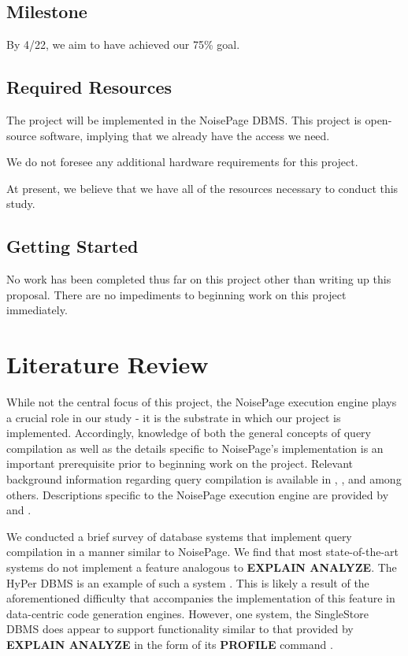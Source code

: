 \documentclass{vldb}
\newcommand{\dbCode}[1]{{\sffamily\small \textbf{#1}}\xspace}
\begin{document}
\subsection{Milestone}

By 4/22, we aim to have achieved our 75\% goal.

\subsection{Required Resources}

The project will be implemented in the NoisePage DBMS. This project is open-source software, implying that we already have the access we need. 

We do not foresee any additional hardware requirements for this project.

At present, we believe that we have all of the resources necessary to conduct this study.

\subsection{Getting Started}

No work has been completed thus far on this project other than writing up this proposal. There are no impediments to beginning work on this project immediately.


\section{Literature Review}

While not the central focus of this project, the NoisePage execution engine plays a crucial role in our study - it is the substrate in which our project is implemented. Accordingly, knowledge of both the general concepts of query compilation as well as the details specific to NoisePage's implementation is an important prerequisite prior to beginning work on the project. Relevant background information regarding query compilation is available in \cite{paroski16}, \cite{krikellas10}, and \cite{neumann11} among others. Descriptions specific to the NoisePage execution engine are provided by \cite{rof} and \cite{pcq}.

We conducted a brief survey of database systems that implement query compilation in a manner similar to NoisePage. We find that most state-of-the-art systems do not implement a feature analogous to \dbCode{EXPLAIN ANALYZE}. The HyPer DBMS is an example of such a system \cite{hyper}. This is likely a result of the aforementioned difficulty that accompanies the implementation of this feature in data-centric code generation engines. However, one system, the SingleStore DBMS does appear to support functionality similar to that provided by \dbCode{EXPLAIN ANALYZE} in the form of its \dbCode{PROFILE} command \cite{singlestore}.
\end{document}
